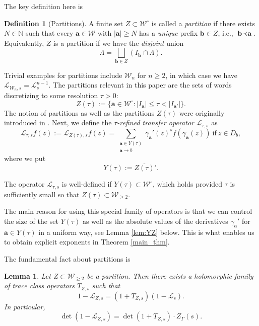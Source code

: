 \documentclass[12pt,letterpaper]{amsart}
\theoremstyle{plain}
\newtheorem{lemma}[prop]{Lemma}
\theoremstyle{definition}
\newtheorem{defi}[prop]{Definition}
\theoremstyle{remark}
\newcommand{\Aa}{\textbf{a}}
\newcommand{\Bb}{\textbf{b}}
\begin{document}
The key definition here is


\begin{defi}[Partitions]
A finite set $Z \subset \mathcal{W}^\circ$ is called a \textit{partition} if there exists $N \in \mathbb{N}$ such that every $\Aa \in \mathcal{W}$ with $|\Aa| \ge N$ has a \textit{unique} prefix $\Bb \in Z$, i.e., $\Bb \prec \Aa$. Equivalently, $Z$ is a partition if we have the \textit{disjoint} union
\[
\Lambda = \bigsqcup_{\Bb \in Z} (I_{\Bb} \cap \Lambda).
\]
\end{defi}

Trivial examples for partitions include $\mathcal{W}_n$ for $n \ge 2$, in which case we have $\mathcal{L}_{\mathcal{W}_n, s} = \mathcal{L}_s^{n - 1}$.
The partitions relevant in this paper are the sets of words discretizing to some resolution $\tau > 0$:
$$
Z(\tau):= \{ \Aa\in \mathcal{W}^{\circ} : \vert I_{\Aa}\vert \le  \tau < \vert I_{\Aa'}\vert \}.
$$
The notion of partitions as well as the partitions $Z(\tau)$ were originally introduced in \cite{DyZw18}. Next, we define the \textit{$\tau$-refined transfer operator} $\mathcal{L}_{\tau,s}$ as
\begin{equation}\label{defiRefinedTO}
\mathcal{L}_{\tau,s}f(z) := \mathcal{L}_{Z(\tau),s}f(z)= \sum_{\substack{ \Aa\in Y(\tau) \\ \Aa\to b}} \gamma_{\Aa}'(z)^s f(\gamma_{\Aa} (z))\ \mathrm{if}\ z\in D_b,
\end{equation}
where we put
\begin{equation}\label{defi:Y}
Y(\tau) := \overline{Z(\tau)}'.
\end{equation}

The operator $\mathcal{L}_{\tau,s}$ is well-defined if $Y(\tau) \subset \mathcal{W}^\circ$, which holds provided $\tau$ is sufficiently small so that $Z(\tau) \subset \mathcal{W}_{\ge 2}$.

The main reason for using this special family of operators is that we can control the size of the set $Y(\tau)$ as well as the absolute values of the derivatives $\gamma_{\Aa}'$ for $\Aa\in Y(\tau)$ in a uniform way, see Lemma \ref{lem:YZ} below. This is what enables us to obtain explicit exponents in Theorem \ref{main_thm}.



The fundamental fact about partitions is

\begin{lemma}\label{lem:partEigen}
Let $Z \subset \mathcal{W}_{\ge 2}$ be a partition. Then there exists a holomorphic family of trace class operators $T_{Z,s}$ such that
\begin{equation}\label{factWithTraceCLass}
1 - \mathcal{L}_{Z,s} = (1 + T_{Z,s})(1 - \mathcal{L}_s).
\end{equation}
In particular,
\begin{equation}\label{detPartitions}
\det(1 - \mathcal{L}_{Z,s}) = \det(1 + T_{Z,s}) \cdot Z_\Gamma(s).
\end{equation}
\end{lemma}
\end{document}

